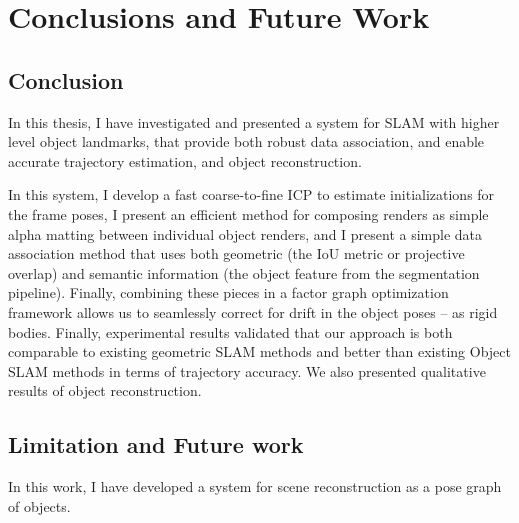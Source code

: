 
\chapter{Conclusions and Future Work} \label{chap:conclusion}

\section{Conclusion}
In this thesis, I have investigated and presented a system for SLAM with higher level object landmarks, that provide both robust data association, and enable accurate trajectory estimation, and object reconstruction.

In this system, I develop a fast coarse-to-fine ICP to estimate initializations for the frame poses, I present an efficient method for composing renders as simple alpha matting between individual object renders, and I present a simple data association method that uses both geometric (the IoU metric or projective overlap) and semantic information (the object feature from the segmentation pipeline). Finally, combining these pieces in a factor graph optimization framework allows us to seamlessly correct for drift in the object poses -- as rigid bodies. Finally, experimental results validated that our approach is both comparable to existing geometric SLAM methods and better than existing Object SLAM methods in terms of trajectory accuracy. We also presented qualitative results of object reconstruction.

\section{Limitation and Future work}

In this work, I have developed a system for scene reconstruction as a pose graph of objects.

